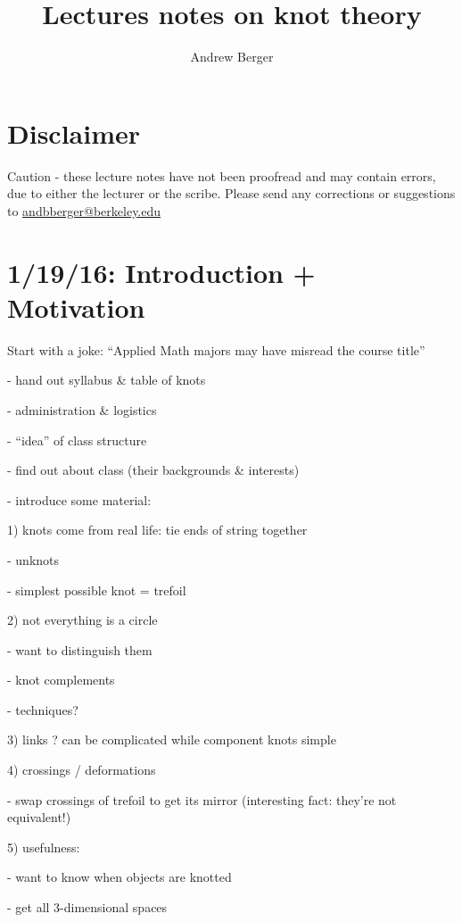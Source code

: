 \documentclass[11pt]{article}
\title{Lectures notes on knot theory}
\author{Andrew Berger}
\theoremstyle{plain}
\theoremstyle{definition}
\begin{document}
\maketitle

\clearpage

\tableofcontents


\clearpage
\section{Disclaimer}

Caution - these lecture notes have not been proofread and may contain errors, due to either the lecturer or the scribe. Please send any corrections or suggestions to \href{mailto:andbberger@berkeley.edu}{andbberger@berkeley.edu}

\clearpage

\section{1/19/16: Introduction + Motivation}

Start with a joke: ``Applied Math majors may have misread the course title''

\bigskip
- hand out syllabus \& table of knots

- administration \& logistics

- ``idea'' of class structure

- find out about class (their backgrounds \& interests)

\bigskip
- introduce some material:

1) knots come from real life: tie ends of string together

- unknots

- simplest possible knot = trefoil

2) not everything is a circle

- want to distinguish them

- knot complements

- techniques?

3) links ? can be complicated while component knots simple

4) crossings / deformations

- swap crossings of trefoil to get its mirror (interesting fact: they're not equivalent!)

5) usefulness:

- want to know when objects are knotted

- get all 3-dimensional spaces
\end{document}
